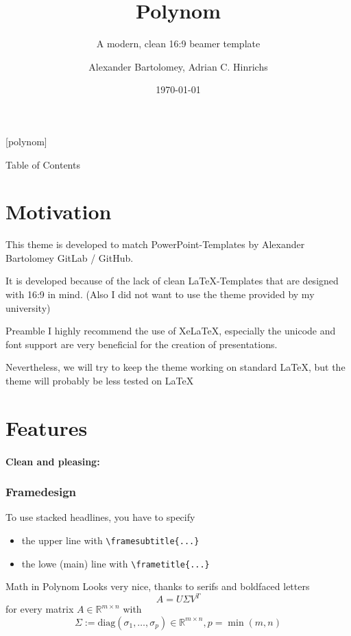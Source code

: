 \documentclass[fragile=singleslide]{beamer}
\title{Polynom}
\subtitle{A modern, clean 16:9 beamer template}
\author{Alexander Bartolomey, Adrian C. Hinrichs}
\date{\today}
\begin{document}
[polynom]{}
\begin{frame}
  \titlepage
\end{frame}

\begin{frame}{Table of Contents}
  \tableofcontents
\end{frame}


\section{Motivation}
\begin{frame}
  This theme is developed to match PowerPoint-Templates by Alexander
  Bartolomey GitLab / GitHub.

  It is developed because of the lack of clean LaTeX-Templates that
  are designed with 16:9 in mind.  (Also I did not want to use the
  theme provided by my university)
\end{frame}

\begin{frame}{Preamble}
  I highly recommend the use of XeLaTeX, especially the unicode and
  font support are very beneficial for the creation of presentations.

  Nevertheless, we will try to keep the theme working on standard
  \LaTeX, but the theme will probably be less tested on \LaTeX
\end{frame}

\section{Features}
\begin{frame}[fragile=singleslide]
  \framesubtitle{Clean and pleasing:}
  \frametitle{Framedesign}
  To use stacked headlines, you have to specify
  \begin{itemize}
  \item the upper line with \verb|\framesubtitle{...}|
  \item the lowe (main) line with \verb|\frametitle{...}|
  \end{itemize}
\end{frame}

\begin{frame}{Math in Polynom}
  Looks very nice, thanks to serifs and boldfaced letters
   \[ A=U\Sigma V^T\]
   for every matrix \( A\in \mathbb{R}^{m\times n}\) with
   \[\Sigma:=\mathrm{diag}(\sigma_1,\dots,\sigma_p) \in \mathbb{R}^{m\times n}, p = \min(m,n)\]
\end{frame}
\end{document}
